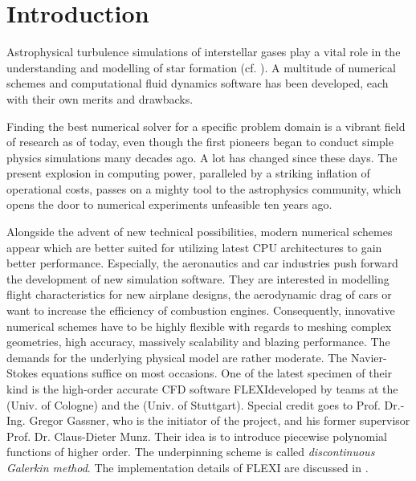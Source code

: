 \section{Introduction}

Astrophysical turbulence simulations of interstellar gases play a vital role in
the understanding and modelling of star formation (cf.
\cite{mac2004turbulence}). A multitude of numerical schemes and computational
fluid dynamics software has been developed, each with their own merits and
drawbacks.

Finding the best numerical solver for a specific problem domain is a vibrant
field of research as of today, even though the first pioneers began to conduct
simple physics simulations many decades ago. A lot has changed since these
days. The present explosion in computing power, paralleled by a striking
inflation of operational costs, passes on a mighty tool to the astrophysics
community, which opens the door to numerical experiments unfeasible ten years
ago.

Alongside the advent of new technical possibilities, modern numerical schemes
appear which are better suited for utilizing latest CPU architectures to gain
better performance. Especially, the aeronautics and car industries push forward
the development of new simulation software. They are interested in modelling
flight characteristics for new airplane designs, the aerodynamic drag of cars
or want to increase the efficiency of combustion engines. Consequently,
innovative numerical schemes have to be highly flexible with regards to meshing
complex geometries, high accuracy, massively scalability and blazing performance.
The demands for the underlying physical model are rather moderate. The
Navier-Stokes equations suffice on most occasions. One of the latest specimen
of their kind is the high-order accurate CFD software FLEXI\footnotemark[1]
developed by teams at the  (Univ. of Cologne) and
the  (Univ. of Stuttgart).
Special credit goes to Prof. Dr.-Ing. Gregor Gassner, who is the initiator of
the project, and his former supervisor Prof.  Dr. Claus-Dieter Munz. Their idea
is to introduce piecewise polynomial functions of higher order. The
underpinning scheme is called \emph{discontinuous Galerkin method}. The
implementation details of FLEXI are discussed in
\cite{hindenlang2014mesh,hindenlang2012explicit,gassner2009discontinuous}.

